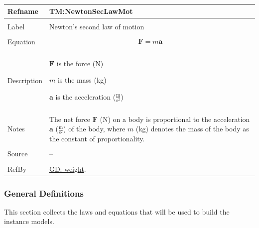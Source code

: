 \documentclass[12pt]{article}
\begin{document}
\noindent \begin{minipage}{\textwidth}
\begin{tabular}{p{} p{}}
\toprule \textbf{Refname} & \textbf{TM:NewtonSecLawMot}
\label{TM:NewtonSecLawMot}
\\ \midrule \\
Label & Newton's second law of motion
\\ \midrule \\
Equation & \begin{displaymath}
           \mathbf{F}=m \mathbf{a}
           \end{displaymath}
\\ \midrule \\
Description & \begin{symbDescription}
              \item{$\mathbf{F}$ is the force (N)}
              \item{$m$ is the mass (kg)}
              \item{$\mathbf{a}$ is the acceleration ($\frac{\text{m}}{\text{s}^{2}}$)}
              \end{symbDescription}
\\ \midrule \\
Notes & The net force $\mathbf{F}$ (N) on a body is proportional to the acceleration $\mathbf{a}$ ($\frac{\text{m}}{\text{s}^{2}}$) of the body, where $m$ (kg) denotes the mass of the body as the constant of proportionality.
\\ \midrule \\
Source & --
\\ \midrule \\
RefBy & \hyperref[GD:weight]{GD: weight}.
\\ \bottomrule \end{tabular}
\end{minipage}
\subsubsection{General Definitions}
\label{Sec:GDs}
This section collects the laws and equations that will be used to build the instance models.
\par~
\end{document}
